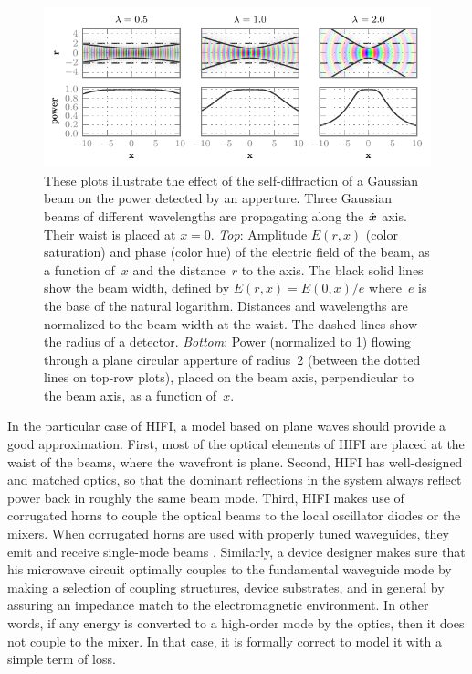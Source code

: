 \begin{figure}
    \centering
    \includegraphics[width=\textwidth]{self_diffraction}
    \caption{
        These plots illustrate the effect of the self-diffraction of a Gaussian beam
        on the power detected by an apperture.
        Three Gaussian beams of different wavelengths
        are propagating along the $\dot{\bm{x}}$ axis.
        Their waist is placed at $x=0$.
        \emph{Top}:
            Amplitude $E(r, x)$ (color saturation) and
            phase (color hue) of the electric field of the beam,
            as a function of~$x$ and the distance~$r$ to the axis.
            The black solid lines show the beam width, defined by $E(r,x)=E(0,x) / e$
            where~$e$ is the base of the natural logarithm.
            Distances and wavelengths are normalized to the beam width at the waist.
            The dashed lines show the radius of a detector.
        \emph{Bottom}:
            Power (normalized to 1) flowing through a plane circular apperture of radius~2
            (between the dotted lines on top-row plots),
            placed on the beam axis, perpendicular to the beam axis, as a function of~$x$.
    }
    \label{fig:self-diffraction}
\end{figure}

In the particular case of HIFI, a model based on plane waves should provide a good approximation.
First, most of the optical elements of HIFI are placed at the waist of the beams, where the wavefront is plane.
Second, HIFI has well-designed and matched optics, so that the dominant reflections in the system always reflect power back in roughly the same beam mode.
Third, HIFI makes use of corrugated horns to couple the optical beams to the local oscillator diodes or the mixers.
When corrugated horns are used with properly tuned waveguides, they emit and receive single-mode beams \parencite{clarricoats1966propagation}.
Similarly, a device designer makes sure that his microwave circuit optimally couples to the fundamental waveguide mode by making a selection of coupling structures, device substrates, and in general by assuring an impedance match to the electromagnetic environment.
In other words, if any energy is converted to a high-order mode by the optics, then it does not couple to the mixer.
In that case, it is formally correct to model it with a simple term of loss.

